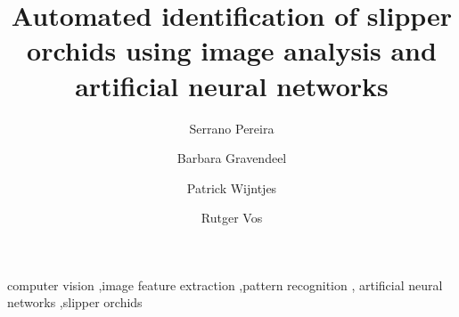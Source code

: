 \documentclass[review,3p,twocolumn]{elsarticle}
\begin{document}
\begin{frontmatter}



\title{Automated identification of slipper orchids using image analysis and artificial neural networks}



\author[nbc]{Serrano Pereira}
\author[nbc,hsl,lu]{Barbara Gravendeel}
\author[hsl]{Patrick Wijntjes}
\author[nbc]{Rutger Vos}
\address[nbc]{Naturalis Biodiversity Center, P.O. Box 9517, Leiden, The Netherlands}
\address[hsl]{University of Applied Sciences Leiden, P.O. Box 382, Leiden, The Netherlands}
\address[lu]{Institute Biology Leiden, Leiden University, P.O. Box 546, Leiden, The Netherlands}


\begin{abstract}
\lipsum[1]
\end{abstract}

\begin{keyword}


computer vision \sep image feature extraction \sep pattern recognition \sep
artificial neural networks \sep slipper orchids
\end{keyword}

\end{frontmatter}

\end{document}
